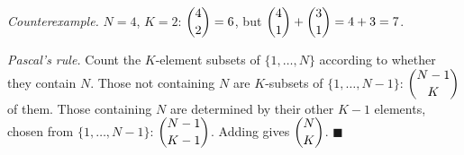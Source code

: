 \emph{Counterexample.} $N=4$, $K=2$: $\dbinom42=6$, but $\dbinom41+\dbinom31=4+3=7$.

\emph{Pascal's rule.} Count the $K$-element subsets of $\{1,\dots,N\}$ according to whether they contain $N$. Those not containing $N$ are $K$-subsets of $\{1,\dots,N-1\}$: $\dbinom{N-1}K$ of them. Those containing $N$ are determined by their other $K-1$ elements, chosen from $\{1,\dots,N-1\}$: $\dbinom{N-1}{K-1}$. Adding gives $\dbinom NK$. $\blacksquare$
